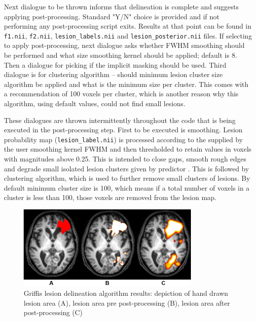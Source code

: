 \documentclass[12pt]{article}
\begin{document}
Next dialogue to be thrown informs that delineation is complete and suggests applying post-processing. Standard "Y/N" choice is provided and if not performing any post-processing script exits. Results at that point can be found in \texttt{f1.nii}, \texttt{f2.nii}, \texttt{lesion\_labels.nii} and \texttt{lesion\_posterior.nii} files. If selecting to apply post-processing, next dialogue asks whether FWHM smoothing should be performed and what size smoothing kernel should be applied; default is 8. Then a dialogue for picking if the implicit masking should be used. Third dialogue is for clustering algorithm – should minimum lesion cluster size algorithm be applied and what is the minimum size per cluster. This comes with a recommendation of 100 voxels per cluster, which is another reason why this algorithm, using default values, could not find small lesions.

These dialogues are thrown intermittently throughout the code that is being executed in the post-processing step. First to be executed is smoothing. Lesion probability map (\texttt{lesion\_label.nii}) is processed according to the supplied by the user smoothing kernel FWHM and then thresholded to retain values in voxels with magnitudes above 0.25. This is intended to close gaps, smooth rough edges and degrade small isolated lesion clusters given by predictor \cite{griffis2016voxel}. This is followed by clustering algorithm, which is used to further remove small clusters of lesions. By default minimum cluster size is 100, which means if a total number of voxels in a cluster is less than 100, those voxels are removed from the lesion map.

\begin{figure}[!htb]
\centering
\includegraphics[width=0.8\textwidth]{img/shitylesions}
\caption{Griffis lesion delineation algorithm results: depiction of hand drawn lesion area (A), lesion area pre post-processing (B), lesion area after post-processing (C)}
\label{fig:shitylesions}
\end{figure}
\end{document}
